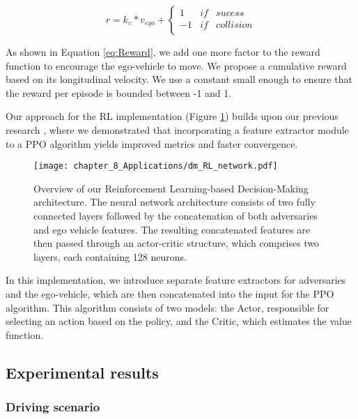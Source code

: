 \begin{equation}
	r = k_v * v_{ego} + \left\lbrace\begin{array}{lcc}
		1 & if & sucess \\ 
		-1 & if & collision \\
	\end{array}\right.
	\label{eq:Reward}
\end{equation}

As shown in Equation \ref{eq:Reward}, we add one more factor to the reward function to encourage the ego-vehicle to move. We propose a cumulative reward based on its longitudinal velocity. We use a constant small enough to ensure that the reward per episode is bounded between -1 and 1.

Our approach for the RL implementation (Figure \ref{fig:chapter_8_Applications/dm_RL_network}) builds upon our previous research \cite{Gutierrez2022}, where we demonstrated that incorporating a feature extractor module to a \ac{PPO} algorithm yields improved metrics and faster convergence. 

\begin{figure}[h]
	\centering
	\texttt{[image: chapter\_8\_Applications/dm\_RL\_network.pdf]}
	\captionsetup{justification=justified}
	\caption[Overview of our Reinforcement Learning-based Decision-Making architecture]{Overview of our Reinforcement Learning-based Decision-Making architecture. The neural network architecture consists of two fully connected layers followed by the concatenation of both adversaries and ego vehicle features. The resulting concatenated features are then passed through an actor-critic structure, which comprises two layers, each containing 128 neurons.}	
	\label{fig:chapter_8_Applications/dm_RL_network}
\end{figure}

In this implementation, we introduce separate feature extractors for adversaries and the ego-vehicle, which are then concatenated into the input for the \ac{PPO} algorithm. This algorithm consists of two models: the Actor, responsible for selecting an action based on the policy, and the Critic, which estimates the value function.

\subsection{Experimental results}
\label{subsec:8_decision_making_experimental_results}

\subsubsection{Driving scenario}
\label{subsubsec:8_decision_making_experimental_results_driving_scenario}

